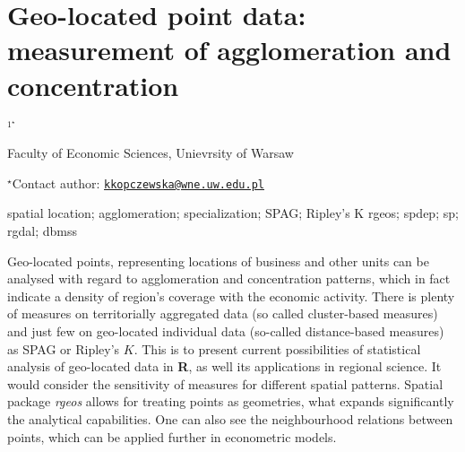 \documentclass[\main/boa.tex]{subfiles}
\begin{document}
\section{Geo-located point data: measurement of agglomeration and concentration}

\begin{center}
  {\bf {}$^{1^\star}$}
\end{center}

\vskip 0.3cm

\begin{affiliations}
\begin{enumerate}
\begin{minipage}{0.915\textwidth}
\centering
\item Faculty of Economic Sciences, Unievrsity of Warsaw \\[-2pt]
\end{minipage}
\end{enumerate}
$^\star$Contact author: \href{mailto:kkopczewska@wne.uw.edu.pl}{\nolinkurl{kkopczewska@wne.uw.edu.pl}}\\
\end{affiliations}

\vskip 0.5cm

\begin{minipage}{0.915\textwidth}
\keywords spatial location; agglomeration; specialization; SPAG; Ripley's K
\packages rgeos; spdep; sp; rgdal; dbmss
\end{minipage}

\vskip 0.8cm

Geo-located points, representing locations of business and other units
can be analysed with regard to agglomeration and concentration patterns,
which in fact indicate a density of region's coverage with the economic
activity. There is plenty of measures on territorially aggregated data
(so called cluster-based measures) and just few on geo-located
individual data (so-called distance-based measures) as SPAG or Ripley's
\(K\). This is to present current possibilities of statistical analysis
of geo-located data in \textbf{R}, as well its applications in regional
science. It would consider the sensitivity of measures for different
spatial patterns. Spatial package \emph{rgeos} allows for treating
points as geometries, what expands significantly the analytical
capabilities. One can also see the neighbourhood relations between
points, which can be applied further in econometric models.
\end{document}
